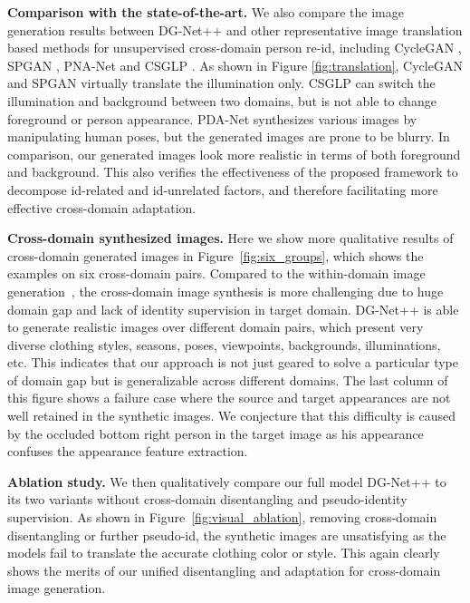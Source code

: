 \documentclass[runningheads]{llncs}
\begin{document}
\noindent\textbf{Comparison with the state-of-the-art.} We also compare the image generation results between DG-Net++ and other representative image translation based methods for unsupervised cross-domain person re-id, including CycleGAN \cite{zhu2017unpaired}, SPGAN \cite{wei2018person}, PNA-Net \cite{li2019cross} and CSGLP \cite{ren2019domain}. As shown in Figure \ref{fig:translation}, CycleGAN and SPGAN virtually translate the illumination only. CSGLP can switch the illumination and background between two domains, but is not able to change foreground or person appearance. PDA-Net synthesizes various images by manipulating human poses, but the generated images are prone to be blurry. In comparison, our generated images look more realistic in terms of both foreground and background. This also verifies the effectiveness of the proposed framework to decompose id-related and id-unrelated factors, and therefore facilitating more effective cross-domain adaptation.

\noindent\textbf{Cross-domain synthesized images.} Here we show more qualitative results of cross-domain generated images in Figure~\ref{fig:six_groups}, which shows the examples on six cross-domain pairs. Compared to the within-domain image generation~\cite{ge2018fd,pose-normalized,zheng2019joint}, the cross-domain image synthesis is more challenging due to huge domain gap and lack of identity supervision in target domain. DG-Net++ is able to generate realistic images over different domain pairs, which present very diverse clothing styles, seasons, poses, viewpoints, backgrounds, illuminations, etc. This indicates that our approach is not just geared to solve a particular type of domain gap but is generalizable across different domains. The last column of this figure shows a failure case where the source and target appearances are not well retained in the synthetic images. We conjecture that this difficulty is caused by the occluded bottom right person in the target image as his appearance confuses the appearance feature extraction. 



\noindent\textbf{Ablation study.} We then qualitatively compare our full model DG-Net++ to its two variants without cross-domain disentangling and pseudo-identity supervision. As shown in Figure~\ref{fig:visual_ablation}, removing cross-domain disentangling or further pseudo-id, the synthetic images are unsatisfying as the models fail to translate the accurate clothing color or style. This again clearly shows the merits of our unified disentangling and adaptation for cross-domain image generation.  
\end{document}
